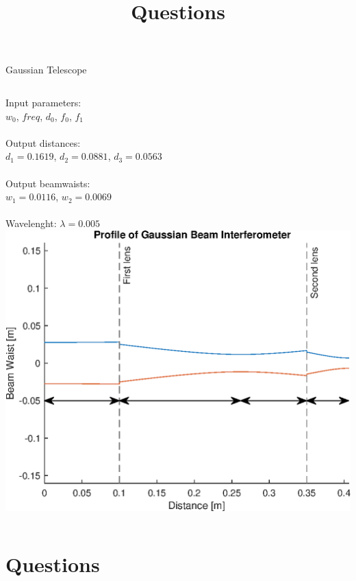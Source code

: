 \documentclass[hyperref={colorlinks=true,urlcolor=blue,linkcolor=.},aspectratio=1610,mathserif]{beamer}
\begin{document}
\begin{frame}{Gaussian Telescope}
    \begin{columns}
    Input parameters:\\
    \(w_0\), \(freq\), \(d_0\), \(f_0\), \(f_1\)\\
    \\
    Output distances:\\
    \(d_1 = 0.1619\), \(d_2 = 0.0881\), \(d_3 = 0.0563\)\\
    \\
    Output beamwaists:\\
    \(w_1 = 0.0116\), \(w_2 = 0.0069\)\\
    \\
    Wavelenght: \(\lambda=0.005\)
    \includegraphics[width=\textwidth]{MatlabFigures/Interferometer/Interferometer.eps}
    \end{columns}
\end{frame}
\section*{Questions}
\title{Questions}
\subtitle{}
\begin{frame}
	\titlepage
\end{frame}
\end{document}
